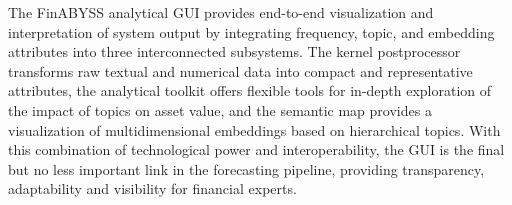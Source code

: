 The FinABYSS analytical GUI provides end-to-end visualization and interpretation of system output
by integrating frequency, topic, and embedding attributes into three interconnected subsystems. The kernel
postprocessor transforms raw textual and numerical data into compact and representative attributes,
the analytical toolkit offers flexible tools for in-depth exploration of the impact of topics on asset value,
and the semantic map provides a visualization of multidimensional embeddings based on hierarchical topics.
With this combination of technological power and interoperability, the GUI is the final but no less important
link in the forecasting pipeline, providing transparency, adaptability and visibility for financial experts.